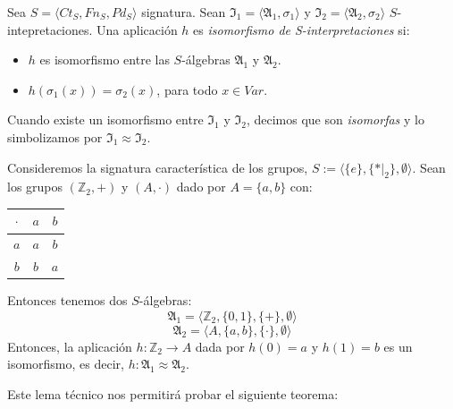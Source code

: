 \begin{definition}
Sea $S = \langle Ct_{S}, Fn_{S}, Pd_{S}\rangle$ signatura. Sean $\mathfrak{I}_1 = \langle \mathfrak{A}_1, \sigma_1 \rangle$ y $\mathfrak{I}_2 = \langle \mathfrak{A}_2, \sigma_2 \rangle$ $S$-intepretaciones. Una aplicación $h$ es \textit{isomorfismo de S-interpretaciones} si:
\begin{itemize}
    \item $h$ es isomorfismo entre las $S$-álgebras $\mathfrak{A}_1$ y $\mathfrak{A}_2$.
    \item $h(\sigma_1(x)) = \sigma_2(x)$, para todo $x \in Var$.
\end{itemize}
Cuando existe un isomorfismo entre $\mathfrak{I}_1$ y $\mathfrak{I}_2$, decimos que son \textit{isomorfas} y lo simbolizamos por $\mathfrak{I}_1 \approx \mathfrak{I}_2$.
\end{definition}

\begin{example}
Consideremos la signatura característica de los grupos, $S := \langle \{e\}, \{*|_2\}, \emptyset \rangle$. Sean los grupos $(\mathbb{Z}_2, +)$ y $(A, \cdot)$ dado por $A = \{a, b\}$ con:
\begin{table}[H]
    \begin{center}
    \begin{tabular}{|c|c|c|}
    \hline 
    $\cdot$ & $a$ & $b$ \\ \hline
    $a$ & $a$ & $b$\\ \hline
    $b$ & $b$ & $a$\\ \hline
    \end{tabular}
    \end{center}
    \end{table}
\end{example}
Entonces tenemos dos $S$-álgebras:
$$\mathfrak{A}_1 = \langle \mathbb{Z}_2, \{ 0,1\}, \{ +\}, \emptyset \rangle$$
$$\mathfrak{A}_2 = \langle A, \{a,b\}, \{\cdot \}, \emptyset \rangle$$
Entonces, la aplicación $h: \mathbb{Z}_2 \rightarrow A$ dada por $h(0) = a$ y $h(1) = b$ es un isomorfismo, es decir, $h:\mathfrak{A}_1 \approx \mathfrak{A}_2$. 

Este lema técnico nos permitirá probar el siguiente teorema:

